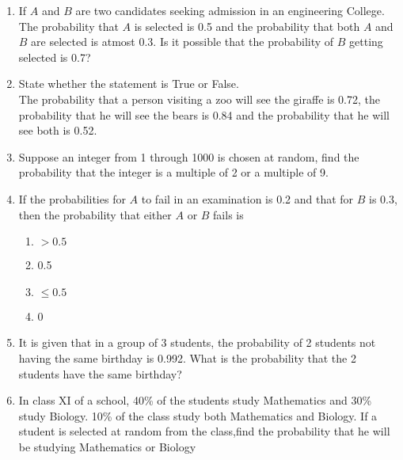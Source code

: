 \begin{enumerate}[label=\thesubsection.\arabic*,ref=\thesubsection.\theenumi]
\item If $A$ and $B$ are two candidates seeking admission in an engineering College. The probability that $A$ is selected is 0.5 and the probability that both $A$ and $B$ are selected is atmost 0.3. Is it possible that the probability of $B$ getting selected is 0.7?\\
\solution 

\item State whether the statement is True or False.\\
The probability that a person visiting a zoo will see the giraffe is 0.72, the probability that he will see the bears is 0.84 and the probability that he will see both is 0.52.\\
\solution

%
\item Suppose an integer from 1 through 1000 is chosen at random, find the probability that the integer is a multiple of 2 or a multiple of 9.
\\
\solution

\item If the probabilities for $A$ to fail in an examination is 0.2 and that for $B$ is 0.3, then
the probability that either $A$ or $B$ fails is
		\vspace{-3mm}
\begin{multicols}{4}
\begin{enumerate}
\item $>0.5$
\item 0.5
\item $\le 0.5$
\item 0
\end{enumerate}
\end{multicols}
		\vspace{-3mm}
\solution

\item It is given that in a group of 3 students, the probability of 2 students not having the same birthday is 0.992. What is the probability that the 2 students have the same birthday?
	\\
\solution

%
\item  In class XI of a school, 40\% of the students study Mathematics and 30\% study Biology. 10\% of the class study both Mathematics and Biology. If a student is selected at random from the class,find the probability that he will be studying Mathematics or Biology
	\\

\end{enumerate}
